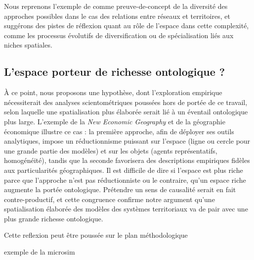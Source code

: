 \documentclass[11pt]{article}
\begin{document}
Nous reprenons l'exemple de \citep{raimbault2017invisible} comme preuve-de-concept de la diversité des approches possibles dans le cas des relations entre réseaux et territoires, et suggérons des pistes de réflexion quant au rôle de l'espace dans cette complexité, comme les processus évolutifs de diversification ou de spécialisation liés aux niches spatiales.



\subsection{L'espace porteur de richesse ontologique ?}

À ce point, nous proposons une hypothèse, dont l'exploration empirique nécessiterait des analyses scientométriques poussées hors de portée de ce travail, selon laquelle une spatialisation plus élaborée serait lié à un éventail ontologique plus large. L'exemple de la \emph{New Economic Geography} et de la géographie économique illustre ce cas \cite{marchionni2004geographical}: la première approche, afin de déployer ses outils analytiques, impose un réductionnisme puissant sur l'espace (ligne ou cercle pour une grande partie des modèles) et sur les objets (agents représentatifs, homogénéité), tandis que la seconde favorisera des descriptions empiriques fidèles aux particularités géographiques. Il est difficile de dire si l'espace est plus riche parce que l'approche n'est pas réductionniste ou le contraire, qu'un espace riche augmente la portée ontologique. Prétendre un sens de causalité serait en fait contre-productif, et cette congruence confirme notre argument qu'une spatialisation élaborée des modèles des systèmes territoriaux va de pair avec une plus grande richesse ontologique.

Cette reflexion peut être poussée sur le plan méthodologique


exemple de la microsim \cite{birkin2011spatial}
\end{document}
